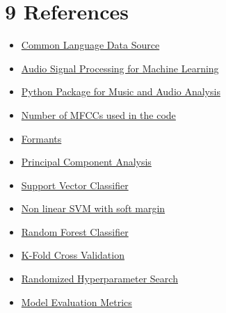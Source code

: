 \documentclass{article}
\begin{document}
\section*{9 \space References}
\begin{itemize}
    \item \href{https://huggingface.co/datasets/common_language}{Common Language Data Source}

    \item \href{https://www.youtube.com/playlist?list=PL-wATfeyAMNqIee7cH3q1bh4QJFAaeNv0}{Audio Signal Processing for Machine Learning}

    \item \href{https://librosa.org/doc/latest/index.html}{Python Package for Music and Audio Analysis}

    \item \href{https://ietresearch.onlinelibrary.wiley.com/doi/full/10.1049/tje2.12082#:~:text=All\%20performance\%20metrics\%20gave\%20the,studies\%20use\%20only\%2013\%20MFCCs}{Number of MFCCs used in the code}
    
    \item \href{https://corpus.eduhk.hk/english_pronunciation/index.php/2-2-formants-of-vowels/}{Formants}

    \item \href{https://scikit-learn.org/stable/modules/generated/sklearn.decomposition.PCA.html}{Principal Component Analysis}
    
    \item \href{https://scikit-learn.org/stable/modules/generated/sklearn.svm.SVC.html}{Support Vector Classifier}
    
    \item \href{https://scikit-learn.org/stable/modules/svm.html#svm-kernels}{Non linear SVM with soft margin}
    
    \item \href{https://scikit-learn.org/stable/modules/generated/sklearn.ensemble.RandomForestClassifier.html}{Random Forest Classifier}

    \item \href{https://scikit-learn.org/stable/modules/generated/sklearn.model_selection.StratifiedKFold.html}{K-Fold Cross Validation}
    
    \item \href{https://scikit-learn.org/stable/modules/generated/sklearn.model_selection.RandomizedSearchCV.html}{Randomized Hyperparameter Search}
    
    \item \href{https://scikit-learn.org/stable/modules/model_evaluation.html#classification-metrics}{Model Evaluation Metrics}

\end{itemize}
\end{document}
